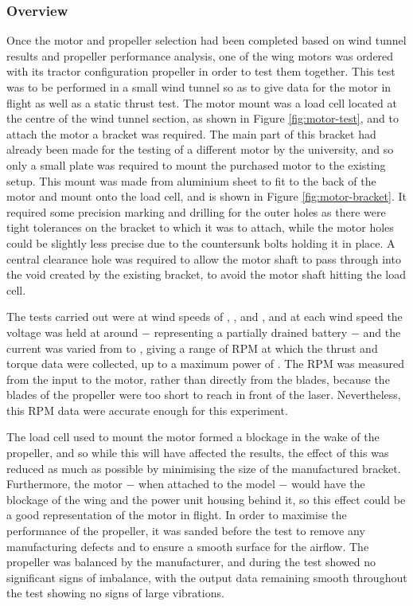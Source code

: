 \documentclass[../../main.tex]{subfiles}
\begin{document}
\subsubsection{Overview} \label{sec:design-process:interim-design-review:motor-and-propellor-test:overview}


Once the motor and propeller selection had been completed based on wind tunnel results and propeller performance analysis, one of the wing motors was ordered with its tractor configuration propeller in order to test them together.
This test was to be performed in a small wind tunnel so as to give data for the motor in flight as well as a static thrust test.
The motor mount was a load cell located at the centre of the wind tunnel section, as shown in Figure \ref{fig:motor-test}, and to attach the motor a bracket was required.
The main part of this bracket had already been made for the testing of a different motor by the university, and so only a small plate was required to mount the purchased motor to the existing setup.
This mount was made from aluminium sheet to fit to the back of the motor and mount onto the load cell, and is shown in Figure \ref{fig:motor-bracket}.
It required some precision marking and drilling for the outer holes as there were tight tolerances on the bracket to which it was to attach, while the motor holes could be slightly less precise due to the countersunk bolts holding it in place.
A central clearance hole was required to allow the motor shaft to pass through into the void created by the existing bracket, to avoid the motor shaft hitting the load cell.

The tests carried out were at wind speeds of , , and , and at each wind speed the voltage was held at around  $-$ representing a partially drained battery $-$ and the current was varied from  to , giving a range of RPM at which the thrust and torque data were collected, up to a maximum power of .
The RPM was measured from the input to the motor, rather than directly from the blades, because the blades of the propeller were too short to reach in front of the laser.
Nevertheless, this RPM data were accurate enough for this experiment.

The load cell used to mount the motor formed a blockage in the wake of the propeller, and so while this will have affected the results, the effect of this was reduced as much as possible by minimising the size of the manufactured bracket.
Furthermore, the motor $-$ when attached to the model $-$ would have the blockage of the wing and the power unit housing behind it, so this effect could be a good representation of the motor in flight.
In order to maximise the performance of the propeller, it was sanded before the test to remove any manufacturing defects and to ensure a smooth surface for the airflow.
The propeller was balanced by the manufacturer, and during the test showed no significant signs of imbalance, with the output data remaining smooth throughout the test showing no signs of large vibrations. 
\end{document}
